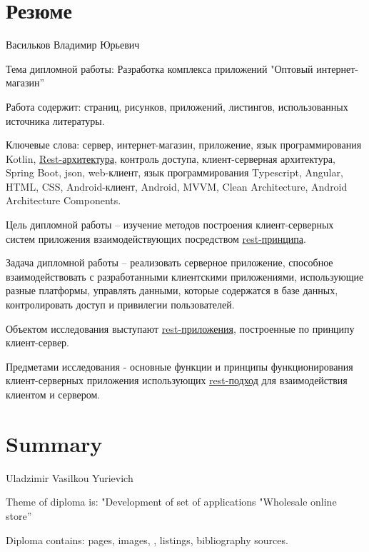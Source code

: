 \pagestyle{empty}
\section*{Резюме}\label{sec:cw-ru}\indent

Васильков Владимир Юрьевич

Тема дипломной работы: Разработка комплекса приложений "Оптовый интернет-магазин”

Работа содержит: \pageref{LastPage} страниц,  рисунков,  приложений,  листингов,  использованных источника литературы.

Ключевые слова: сервер, интернет-магазин, приложение, язык программирования Kotlin, \hyperlink{gloss:rest}{Rest-архитектура}, контроль доступа, клиент-серверная архитектура, Spring Boot, json, web-клиент, язык программирования Typescript, Angular, HTML, CSS, Android-клиент, Android, MVVM, Clean Architecture, Android Architecture Components.

Цель дипломной работы – изучение методов построения клиент-серверных систем приложения взаимодействующих посредством \hyperlink{gloss:rest}{rest-принципа}.

Задача дипломной работы – реализовать серверное приложение, способное взаимодействовать с разработанными клиентскими приложениями, использующие разные платформы, управлять данными, которые содержатся в базе данных, контролировать доступ и привилегии пользователей.

Объектом исследования выступают \hyperlink{gloss:rest}{rest-приложения}, построенные по принципу клиент-сервер.

Предметами исследования - основные функции и принципы функционирования клиент-серверных приложения использующих \hyperlink{gloss:rest}{rest-подход} для взаимодействия клиентом и сервером.

\section*{Summary}\label{sec:cw-eng}\indent
{}

Uladzimir Vasilkou Yurievich

Theme of diploma is: "Development of set of applications "Wholesale online store”

Diploma contains: \pageref{LastPage} pages,  images, ,  listings,  bibliography sources.

